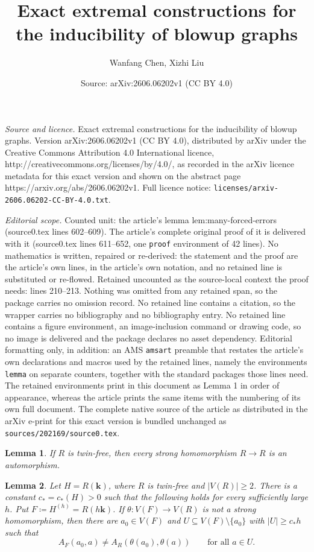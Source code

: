 \documentclass[10pt,a4paper]{amsart}
\title{Exact extremal constructions for the inducibility of blowup graphs}
\author{Wanfang Chen, Xizhi Liu}
\date{Source: arXiv:2606.06202v1 (CC BY 4.0)}
\newtheorem{lemma}{Lemma}
\begin{document}
\maketitle

\noindent\emph{Source and licence.} Exact extremal constructions for the inducibility of blowup graphs. Version arXiv:2606.06202v1 (CC BY 4.0), distributed by arXiv under the Creative Commons Attribution 4.0 International licence, http://creativecommons.org/licenses/by/4.0/, as recorded in the arXiv licence metadata for this exact version and shown on the abstract page https://arxiv.org/abs/2606.06202v1. Full licence notice: \texttt{licenses/arxiv-2606.06202-CC-BY-4.0.txt}.\par\smallskip

\noindent\textit{Editorial scope.} Counted unit: the article's lemma lem:many-forced-errors (source0.tex lines 602--609). The article's complete original proof of it is delivered with it (source0.tex lines 611--652, one \texttt{proof} environment of 42 lines). No mathematics is written, repaired or re-derived: the statement and the proof are the article's own lines, in the article's own notation, and no retained line is substituted or re-flowed.  Retained uncounted as the source-local context the proof needs: lines 210--213.  Nothing was omitted from any retained span, so the package carries no omission record.  No retained line contains a citation, so the wrapper carries no bibliography and no bibliography entry.  No retained line contains a figure environment, an image-inclusion command or drawing code, so no image is delivered and the package declares no asset dependency.  Editorial formatting only, in addition: an AMS \texttt{amsart} preamble that restates the article's own declarations and macros used by the retained lines, namely the environments \texttt{lemma} on separate counters, together with the standard packages those lines need.  The retained environments print in this document as Lemma 1 in order of appearance, whereas the article prints the same items with the numbering of its own full document.  The complete native source of the article as distributed in the arXiv e-print for this exact version is bundled unchanged as \texttt{sources/202169/source0.tex}.
\begin{lemma}
\label{lem:twin-free-auto}
If $R$ is twin-free, then every strong homomorphism $R\to R$ is an automorphism.
\end{lemma}

\begin{lemma}
\label{lem:many-forced-errors}
Let $H=R(\mathbf k)$, where $R$ is twin-free and $|V(R)|\ge2$. There is a constant $c_*=c_*(H)>0$ such that the following holds for every sufficiently large $h$. Put $F\coloneqq H^{(h)}=R(h\mathbf k)$. If $\theta:V(F)\to V(R)$ is not a strong homomorphism, then there are $a_0\in V(F)$ and $U\subseteq V(F)\setminus\{a_0\}$ with $|U|\ge c_*h$ such that
\[
        A_F(a_0,a)\ne A_R(\theta(a_0),\theta(a))
        \qquad\text{for all }a\in U.
\]
\end{lemma}
\end{document}
